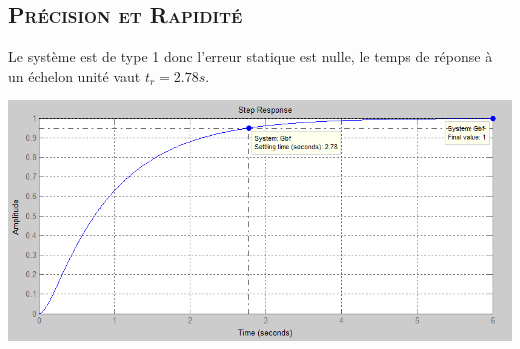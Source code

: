 \subsection{\textsc{Précision et Rapidité}}

	\par Le système est de type 1 donc l'erreur statique est nulle, le temps de réponse à un échelon unité vaut $t_r=2.78 s.$

	\begin{center}
	\includegraphics[scale=0.5]{step1.png}
	\label{fig4} 
	\end{center}
	